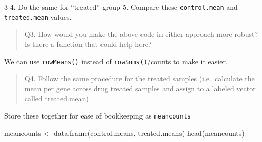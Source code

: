 \documentclass[
  letterpaper,
  DIV=11,
  numbers=noendperiod]{scrartcl}
\newenvironment{Shaded}{\begin{snugshade}}{\end{snugshade}}
\newcommand{\CommentTok}[1]{\textcolor[rgb]{0.37,0.37,0.37}{#1}}
\newcommand{\DecValTok}[1]{\textcolor[rgb]{0.68,0.00,0.00}{#1}}
\newcommand{\FunctionTok}[1]{\textcolor[rgb]{0.28,0.35,0.67}{#1}}
\newcommand{\NormalTok}[1]{\textcolor[rgb]{0.00,0.23,0.31}{#1}}
\newcommand{\OtherTok}[1]{\textcolor[rgb]{0.00,0.23,0.31}{#1}}
\newcommand{\SpecialCharTok}[1]{\textcolor[rgb]{0.37,0.37,0.37}{#1}}
\newcommand{\StringTok}[1]{\textcolor[rgb]{0.13,0.47,0.30}{#1}}
\begin{document}
3-4. Do the same for ``treated'' group 5. Compare these
\texttt{control.mean} and \texttt{treated.mean} values.

\begin{Shaded}
\end{Shaded}

\begin{quote}
Q3. How would you make the above code in either approach more robust? Is
there a function that could help here?
\end{quote}

We can use \texttt{rowMeans()} instead of \texttt{rowSums()}/counts to
make it easier.

\begin{quote}
Q4. Follow the same procedure for the treated samples (i.e.~calculate
the mean per gene across drug treated samples and assign to a labeled
vector called treated.mean)
\end{quote}

\begin{Shaded}
\end{Shaded}

Store these together for ease of bookkeeping as \texttt{meancounts}

\begin{Shaded}
\begin{Highlighting}[]
\NormalTok{meancounts }\OtherTok{\textless{}{-}} \FunctionTok{data.frame}\NormalTok{(control.means, treated.means)}
\FunctionTok{head}\NormalTok{(meancounts)}
\end{Highlighting}
\end{Shaded}
\end{document}
